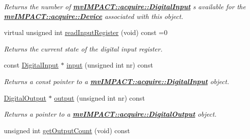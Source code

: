 \begin{DoxyCompactItemize}
\begin{DoxyCompactList}\small\item\em Returns the number of {\bfseries \hyperlink{classmv_i_m_p_a_c_t_1_1acquire_1_1_digital_input}{mv\+I\+M\+P\+A\+C\+T\+::acquire\+::\+Digital\+Input}} s available for the {\bfseries \hyperlink{classmv_i_m_p_a_c_t_1_1acquire_1_1_device}{mv\+I\+M\+P\+A\+C\+T\+::acquire\+::\+Device}} associated with this object. \end{DoxyCompactList}\item 
virtual unsigned int \hyperlink{classmv_i_m_p_a_c_t_1_1acquire_1_1_i_o_sub_system_a2370e52d2818ff78f977dc1112027e15}{read\+Input\+Register} (void) const =0
\begin{DoxyCompactList}\small\item\em Returns the current state of the digital input register. \end{DoxyCompactList}\item 
const \hyperlink{classmv_i_m_p_a_c_t_1_1acquire_1_1_digital_input}{Digital\+Input} $\ast$ \hyperlink{classmv_i_m_p_a_c_t_1_1acquire_1_1_i_o_sub_system_a4d7b7016bff7aa59c6963748936f148d}{input} (unsigned int nr) const 
\begin{DoxyCompactList}\small\item\em Returns a const pointer to a {\bfseries \hyperlink{classmv_i_m_p_a_c_t_1_1acquire_1_1_digital_input}{mv\+I\+M\+P\+A\+C\+T\+::acquire\+::\+Digital\+Input}} object. \end{DoxyCompactList}\item 
\hyperlink{classmv_i_m_p_a_c_t_1_1acquire_1_1_digital_output}{Digital\+Output} $\ast$ \hyperlink{classmv_i_m_p_a_c_t_1_1acquire_1_1_i_o_sub_system_a53e4cfdb38ae5d78ec9baa7434388ac0}{output} (unsigned int nr) const 
\begin{DoxyCompactList}\small\item\em Returns a pointer to a {\bfseries \hyperlink{classmv_i_m_p_a_c_t_1_1acquire_1_1_digital_output}{mv\+I\+M\+P\+A\+C\+T\+::acquire\+::\+Digital\+Output}} object. \end{DoxyCompactList}\item 
\hypertarget{classmv_i_m_p_a_c_t_1_1acquire_1_1_i_o_sub_system_a84a4cbe51bdc3829d3d124c9200508af}{unsigned int \hyperlink{classmv_i_m_p_a_c_t_1_1acquire_1_1_i_o_sub_system_a84a4cbe51bdc3829d3d124c9200508af}{get\+Output\+Count} (void) const }\label{classmv_i_m_p_a_c_t_1_1acquire_1_1_i_o_sub_system_a84a4cbe51bdc3829d3d124c9200508af}


\end{DoxyCompactItemize}

